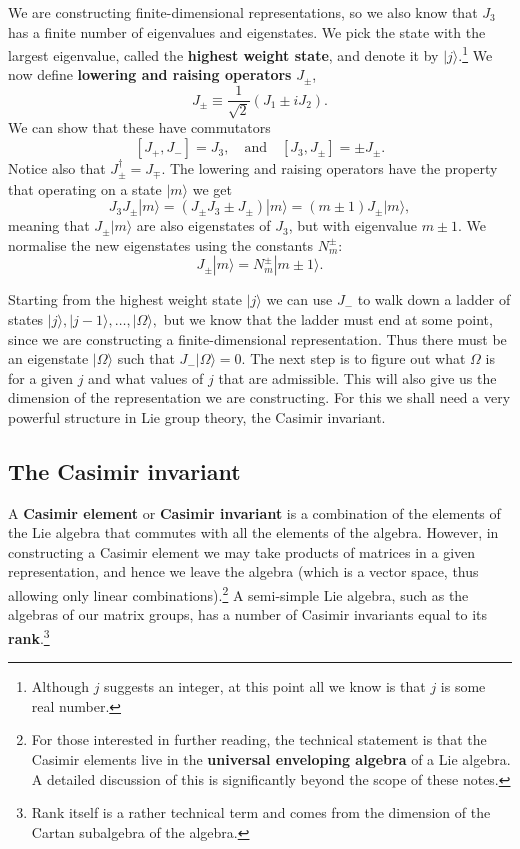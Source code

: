 \documentclass[notes.tex]{subfiles}
\begin{document}
We are constructing finite-dimensional representations, so we also know that $J_3$ has a finite number of eigenvalues and eigenstates. We pick the state with the largest eigenvalue, called the {\bf highest weight state}, and denote it by $|j\rangle$.\footnote{Although $j$ suggests an integer, at this point all we know is that $j$ is some real number.} We now define {\bf lowering and raising operators} $J_\pm$,
\[ J_\pm \equiv\frac{1}{\sqrt{2}}(J_1\pm i J_2). \]
We can show that these have commutators
\[ [J_+, J_-]=J_3,\quad\text{and}\quad [J_3,J_\pm]=\pm J_\pm. \]
Notice also that $J_\pm^\dagger=J_\mp$. 
The lowering and raising operators have the property that operating on a state $|m\rangle$ we get 
\[ J_3J_\pm |m\rangle=(J_\pm J_3\pm J_\pm)|m\rangle=(m\pm1)J_\pm|m\rangle, \]
meaning that $J_\pm |m\rangle$ are also eigenstates of $J_3$, but with eigenvalue $m\pm1$. 
We normalise the new eigenstates using the constants $N_m^\pm$:
\[ J_\pm|m\rangle = N_m^\pm |m\pm1\rangle. \]

Starting from the highest weight state $|j\rangle$ we can use $J_-$ to walk down a ladder of states
$|j\rangle, |j-1\rangle,\ldots,|\Omega\rangle,$ but we know that the ladder must end at some point, since we are constructing a finite-dimensional representation. Thus there must be an eigenstate $|\Omega\rangle$ such that
$J_-|\Omega\rangle=0$.
The next step is to figure out what $\Omega$ is for a given $j$ and what values of $j$ that are admissible. This will also give us the dimension of the representation we are constructing. For this we shall need a very powerful structure in Lie group theory, the Casimir invariant.


\subsection{The Casimir invariant}
A {\bf Casimir element} or {\bf Casimir invariant} is a combination of the elements of the Lie algebra that commutes with all the elements of the algebra. However, in constructing a Casimir element we may take products of matrices in a given representation, and hence we leave the algebra (which is a vector space, thus allowing only linear combinations).\footnote{For those interested in further reading, the technical statement is that the Casimir elements live in the {\bf universal enveloping algebra} of a Lie algebra. A detailed discussion of this is significantly beyond the scope of these notes.}
A semi-simple Lie algebra, such as the algebras of our matrix groups, has a number of Casimir invariants equal to its {\bf rank}.\footnote{Rank itself is a rather technical term and comes from the dimension of the Cartan subalgebra of the algebra.} 
\end{document}
